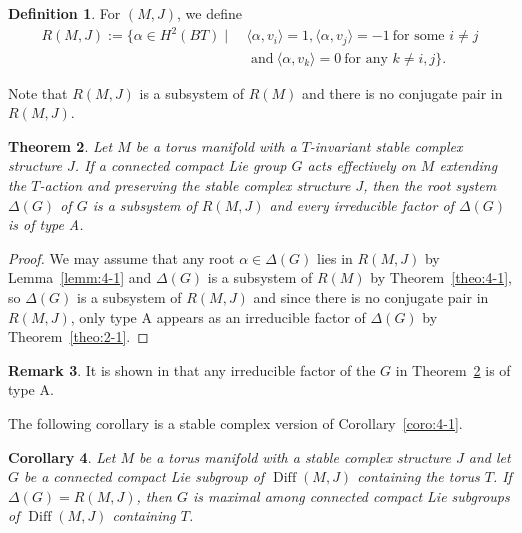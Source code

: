 \documentclass[12pt]{amsart}
\theoremstyle{plain} \numberwithin{equation}{section}
\newtheorem{theo}{Theorem}[section]
\newtheorem{coro}[theo]{Corollary}
\theoremstyle{definition}
\newtheorem{defi}[theo]{Definition}
\newtheorem{rema}[theo]{Remark}
\def\RG{\Delta(G)}
\DeclareMathOperator{\Diff}{Diff}
\begin{document}
\begin{defi}
For $(M,J)$, we define 
\[
\begin{split}
R(M,J):=\{ \alpha\in H^2(BT)\mid &\ \langle \alpha,v_i\rangle=1, 
\langle \alpha,v_j\rangle=-1\  \text{for some $i\not=j$}\\
&\ \text{ and}\ \langle\alpha,v_k\rangle=0
\  \text{for any $k\not=i,j$}\}.
\end{split}
\]
\end{defi}

Note that $R(M,J)$ is a subsystem of $R(M)$ and there is no conjugate pair in $R(M,J)$.%

\begin{theo} \label{theo:5-1}
Let  $M$ be a torus manifold with a $T$-invariant stable complex structure $J$.  If a connected compact Lie group $G$ acts effectively on $M$ extending the $T$-action and preserving the stable complex structure $J$, then the root system $\RG$ of $G$ is a subsystem of $R(M,J)$ and every irreducible factor of $\RG$ is of type A. 
\end{theo}

\begin{proof}
We may assume that any root $\alpha\in \RG$ lies in $R(M,J)$ by Lemma~\ref{lemm:4-1} and $\RG$ is a subsystem of $R(M)$ by Theorem~\ref{theo:4-1}, so $\RG$ is a subsystem of $R(M,J)$ and since there is no conjugate pair in $R(M,J)$, only type A appears as an irreducible factor of $\RG$ by Theorem~\ref{theo:2-1}. 
\end{proof}

\begin{rema}
It is shown in \cite[Lemma 5.8]{wiem10} that any irreducible factor of the $G$ in Theorem~\ref{theo:5-1} is of type A.  
\end{rema}

The following corollary is a stable complex version of Corollary~\ref{coro:4-1}. 

\begin{coro} \label{coro:5-1}
Let $M$ be a torus manifold with a stable complex structure $J$ and let $G$ be a connected compact Lie subgroup of $\Diff(M,J)$ containing the torus $T$.  If $\RG=R(M,J)$, then $G$ is maximal among connected compact Lie subgroups of $\Diff(M,J)$ containing $T$.  
\end{coro}
\end{document}
